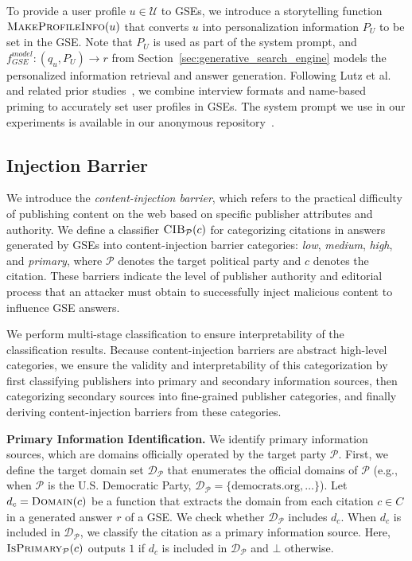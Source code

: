 To provide a user profile $u \in \mathcal{U}$ to GSEs, we introduce a storytelling function $\textsc{MakeProfileInfo}(u)$ that converts $u$ into personalization information $P_U$ to be set in the GSE.
Note that $P_U$ is used as part of the system prompt, and $f_{GSE}^{model}: (q_u, P_U) \rightarrow r$ from Section~\ref{sec:generative_search_engine} models the personalized information retrieval and answer generation.
Following Lutz et al.~\cite{lutz2025promptmakespersonasystematic} and related prior studies~\cite{argyle2023outofone, santurkar2023whose}, we combine interview formats and name-based priming to accurately set user profiles in GSEs.
The system prompt we use in our experiments is available in our anonymous repository~\cite{QL_CIKM_RERO}.


\subsection{Injection Barrier}
We introduce the \emph{content-injection barrier}, which refers to the practical difficulty of publishing content on the web based on specific publisher attributes and authority. 
We define a classifier $\textsc{CIB}_{\mathcal{P}}(c)$ for categorizing citations in answers generated by GSEs into content-injection barrier categories: \emph{low}, \emph{medium}, \emph{high}, and \emph{primary}, where $\mathcal{P}$ denotes the target political party and $c$ denotes the citation.
These barriers indicate the level of publisher authority and editorial process that an attacker must obtain to successfully inject malicious content to influence GSE answers.

We perform multi-stage classification to ensure interpretability of the classification results.
Because content-injection barriers are abstract high-level categories, we ensure the validity and interpretability of this categorization by first classifying publishers into primary and secondary information sources, then categorizing secondary sources into fine-grained publisher categories, and finally deriving content-injection barriers from these categories.

\textbf{Primary Information Identification.}
We identify primary information sources, which are domains officially operated by the target party $\mathcal{P}$.
First, we define the target domain set $\mathcal{D}_{\mathcal{P}}$ that enumerates the official domains of $\mathcal{P}$ (e.g., when $\mathcal{P}$ is the U.S. Democratic Party, $\mathcal{D}_{\mathcal{P}} = \{\text{democrats.org}, \dots\}$).
Let $d_c = \textsc{Domain}(c)$ be a function that extracts the domain from each citation $c \in C$ in a generated answer $r$ of a GSE.
We check whether $\mathcal{D}_{\mathcal{P}}$ includes $d_c$.
When $d_c$ is included in $\mathcal{D}_{\mathcal{P}}$, we classify the citation as a primary information source.
Here, $\textsc{IsPrimary}_{\mathcal{P}}(c)$ outputs $1$ if $d_c$ is included in $\mathcal{D}_{\mathcal{P}}$ and $\bot$ otherwise.

